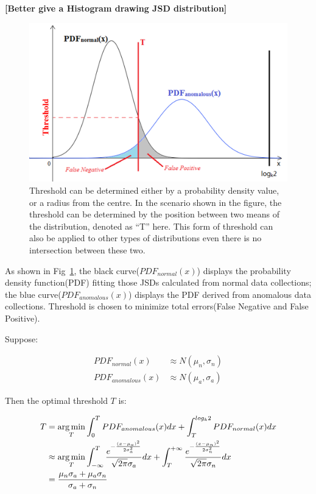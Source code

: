 \documentclass[10pt,conference,letterpaper]{IEEEtran}
\begin{document}
			\textbf{[Better give a Histogram drawing JSD distribution]}
			
			\begin{figure}[!t]
				\centering
				\includegraphics[width=\linewidth]{fig/ExampleThreshold.png}
				\caption{Threshold can be determined either by a probability density value, or a radius from the centre. In the scenario shown in the figure, the threshold can be determined by the position between two means of the distribution, denoted as ``T'' here. This form of threshold can also be applied to other types of distributions even there is no intersection between these two.}
				\label{fig:example-threshold}
			\end{figure}
	
			As shown in Fig~\ref{fig:example-threshold}, the black curve($PDF_{normal}(x)$) displays the probability density function(PDF) fitting those JSDs calculated from normal data collections; the blue curve($PDF_{anomalous}(x)$) displays the PDF derived from anomalous data collections. Threshold is chosen to minimize total errors(False Negative and False Positive).
			
			Suppose:
	
			\begin{align}
				PDF_{normal}(x) &\approx N(\mu_n, \sigma_n)\\
				PDF_{anomalous}(x) &\approx N(\mu_a, \sigma_a)
			\end{align}
			
			Then the optimal threshold $T$ is:
	
			\begin{equation}\label{equ:linear-weight}
				\small
				\begin{split}
					T &= \mathop{\arg\min}_{T} \int_{0}^{T}PDF_{anomalous}(x)dx +
					\int_{T}^{log_k2}PDF_{normal}(x)dx\\
					& \approx \mathop{\arg\min}_{T}
					\int_{-\infty}^{T}
					\frac{e^{-\frac{(x - \mu_a)^2}{2\sigma_a^2}}}{\sqrt{2\pi} \sigma_a}dx
					+ \int_{T}^{+\infty}
					\frac{e^{-\frac{(x - \mu_n)^2}{2\sigma_n^2}}}{\sqrt{2\pi} \sigma_n}dx\\
					& = \frac{\mu_n\sigma_a + \mu_a\sigma_n}{\sigma_a + \sigma_n}
				\end{split}
			\end{equation}
	
\end{document}

